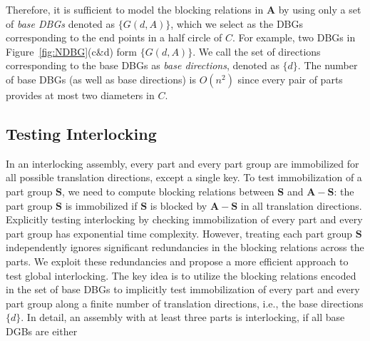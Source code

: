 Therefore, it is sufficient to model the blocking relations in $\mathbf{A}$ by using only a set of {\em base DBGs} denoted as $\{G(d, A)\}$, which we select as the DBGs corresponding to the end points in a half circle of $C$.
For example, two DBGs in Figure~\ref{fig:NDBG}(c\&d) form $\{G(d, A)\}$.
We call the set of directions corresponding to the base DBGs as {\em base directions}, denoted as $\{d\}$.
The number of base DBGs (as well as base directions) is $O(n^2)$ since every pair of parts provides at most two diameters in $C$.  





\subsection{Testing Interlocking}
In an interlocking assembly, every part and every part group are immobilized for all possible translation directions, except a single key.
To test immobilization of a part group $\mathbf{S}$, we need to compute blocking relations between $\mathbf{S}$ and $\mathbf{A}-\mathbf{S}$:  the part group $\mathbf{S}$ is immobilized if $\mathbf{S}$ is blocked by $\mathbf{A}-\mathbf{S}$ in all translation directions.
Explicitly testing interlocking by checking immobilization of every part and every part group has exponential time complexity. 
However, treating each part group $\mathbf{S}$ independently ignores significant redundancies in the blocking relations across the parts.
%
We exploit these redundancies and propose a more efficient approach to test global interlocking. 
The key idea is to utilize the blocking relations encoded in the set of base DBGs to implicitly test immobilization of every part and every part group along a finite number of translation directions, i.e., the base directions $\{d\}$.
In detail, an assembly with at least three parts is interlocking, if all base DGBs are either

